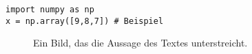 

\blinddocument
{}

\begin{verbatim}
import numpy as np
x = np.array([9,8,7]) # Beispiel
\end{verbatim}

\begin{figure}[h]
  \centering
  \caption{Ein Bild, das die Aussage des Textes unterstreicht.}
  \label{fig:statement}
\end{figure}
